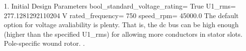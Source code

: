 
1. Initial Design Parameters 
bool_standard_voltage_rating= True
U1_rms= 277.1281292110204 V
rated_frequency= 750
speed_rpm= 45000.0
The default option for voltage avaliability is plenty. That is, the dc bus can be high enough (higher than the specified U1_rms) for allowing more conductors in stator slots.
Pole-specific wound rotor.
.
